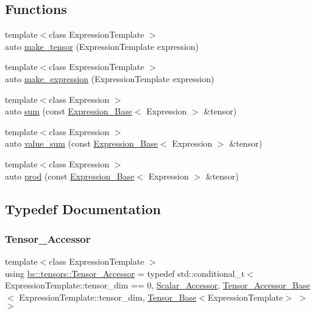 \subsection*{Functions}
\begin{DoxyCompactItemize}
\item 
{\footnotesize template$<$class Expression\+Template $>$ }\\auto \hyperlink{namespacebc_1_1tensors_a233ba24319d0e30ec3026f1643f8facb}{make\+\_\+tensor} (Expression\+Template expression)
\item 
{\footnotesize template$<$class Expression\+Template $>$ }\\auto \hyperlink{namespacebc_1_1tensors_a9340c1c54caa73ef6af71c5f7d378d07}{make\+\_\+expression} (Expression\+Template expression)
\item 
{\footnotesize template$<$class Expression $>$ }\\auto \hyperlink{namespacebc_1_1tensors_ab1c0098cd07860d0dd6e123553fa9816}{sum} (const \hyperlink{classbc_1_1tensors_1_1Expression__Base}{Expression\+\_\+\+Base}$<$ Expression $>$ \&tensor)
\item 
{\footnotesize template$<$class Expression $>$ }\\auto \hyperlink{namespacebc_1_1tensors_a7fe17de15a2dbdb35c53c2096415b10c}{value\+\_\+sum} (const \hyperlink{classbc_1_1tensors_1_1Expression__Base}{Expression\+\_\+\+Base}$<$ Expression $>$ \&tensor)
\item 
{\footnotesize template$<$class Expression $>$ }\\auto \hyperlink{namespacebc_1_1tensors_adc4bc353674317539fe28f7a8e13a515}{prod} (const \hyperlink{classbc_1_1tensors_1_1Expression__Base}{Expression\+\_\+\+Base}$<$ Expression $>$ \&tensor)
\end{DoxyCompactItemize}


\subsection{Typedef Documentation}
\mbox{\label{namespacebc_1_1tensors_ac97d14866c50588a3fd111f362caf9f1}} 
\subsubsection{\texorpdfstring{Tensor\+\_\+\+Accessor}{Tensor\_Accessor}}
{\footnotesize\ttfamily template$<$class Expression\+Template $>$ \\
using \hyperlink{namespacebc_1_1tensors_ac97d14866c50588a3fd111f362caf9f1}{bc\+::tensors\+::\+Tensor\+\_\+\+Accessor} = typedef std\+::conditional\+\_\+t$<$ Expression\+Template\+::tensor\+\_\+dim == 0, \hyperlink{structbc_1_1tensors_1_1Scalar__Accessor}{Scalar\+\_\+\+Accessor}, \hyperlink{classbc_1_1tensors_1_1Tensor__Accessor__Base}{Tensor\+\_\+\+Accessor\+\_\+\+Base}$<$ Expression\+Template\+::tensor\+\_\+dim, \hyperlink{classbc_1_1tensors_1_1Tensor__Base}{Tensor\+\_\+\+Base}$<$Expression\+Template$>$ $>$$>$}



